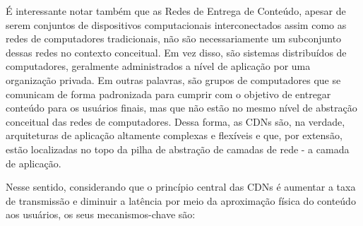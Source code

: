 É interessante notar também que as Redes de Entrega de Conteúdo, apesar de serem conjuntos de dispositivos computacionais interconectados assim como as redes de computadores tradicionais, não são necessariamente um subconjunto dessas redes no contexto conceitual. Em vez disso, são sistemas distribuídos de computadores, geralmente administrados a nível de aplicação por uma organização privada. Em outras palavras, são grupos de computadores que se comunicam de forma padronizada para cumprir com o objetivo de entregar conteúdo para os usuários finais, mas que não estão no mesmo nível de abstração conceitual das redes de computadores. Dessa forma, as CDNs são, na verdade, arquiteturas de aplicação altamente complexas e flexíveis e que, por extensão, estão localizadas no topo da pilha de abstração de camadas de rede - a camada de aplicação.

Nesse sentido, considerando que o princípio central das CDNs é aumentar a taxa de transmissão e diminuir a latência por meio da aproximação física do conteúdo aos usuários, os seus mecanismos-chave são:

